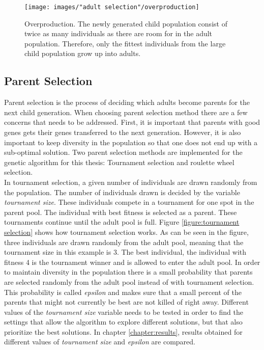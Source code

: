 \begin{figure}[h!]
\begin{center}
\texttt{[image: images/"adult selection"/overproduction]}
\caption{Overproduction. The newly generated child population consist of twice as many individuals as there are room for in the adult population. Therefore, only the fittest individuals from the large child population grow up into adults.}
\label{figure:overproduction}
\end{center}
\end{figure}



\subsection{Parent Selection}\label{subsection:parent selection}
Parent selection is the process of deciding which adults become parents for the next child generation. When choosing parent selection method there are a few concerns that needs to be addressed. First, it is important that parents with good genes gets their genes transferred to the next generation. However, it is also important to keep diversity in the population so that one does not end up with a sub-optimal solution. Two parent selection methods are implemented for the genetic algorithm for this thesis: Tournament selection and roulette wheel selection. \\

\noindent In tournament selection, a given number of individuals are drawn randomly from the population. The number of individuals drawn is decided by the variable \textit{tournament size}. These individuals compete in a tournament for one spot in the parent pool. The individual with best fitness is  selected as a parent. These tournaments continue until the adult pool is full. Figure \ref{figure:tournament selection} shows how tournament selection works. As can be seen in the figure, three individuals are drawn randomly from the adult pool, meaning that the tournament size in this example is 3. The best individual, the individual with fitness 4 is the tournament winner and is allowed to enter the adult pool. In order to maintain diversity in the population there is a small probability that parents are selected randomly from the adult pool instead of with tournament selection. This probability is called \textit{epsilon} and makes sure that a small percent of the parents that might not currently be best are not killed of right away. Different values of the \textit{tournament size} variable needs to be tested in order to find the settings that allow the algorithm to explore different solutions, but that also prioritize the best solutions. In chapter \ref{chapter:results}, results obtained for different values of \textit{tournament size} and \textit{epsilon} are compared. \\


